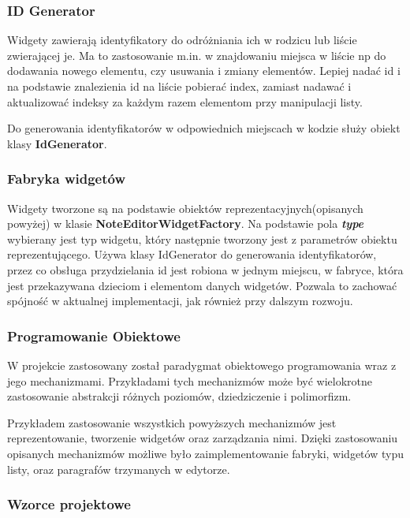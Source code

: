 \subsubsection{ID Generator}

Widgety zawierają identyfikatory do odróżniania ich w rodzicu lub liście zwierającej je. Ma to zastosowanie m.in. w znajdowaniu miejsca w liście np do dodawania nowego elementu, czy usuwania i zmiany elementów. Lepiej nadać id i na podstawie znalezienia id na liście pobierać index, zamiast nadawać i aktualizować indeksy za każdym razem elementom przy manipulacji listy.

Do generowania identyfikatorów w odpowiednich miejscach w kodzie służy obiekt klasy \textbf{IdGenerator}.

\subsubsection{Fabryka widgetów}

Widgety tworzone są na podstawie obiektów reprezentacyjnych(opisanych powyżej) w klasie \textbf{NoteEditorWidgetFactory}. Na podstawie pola \textbf{\textit{type}} wybierany jest typ widgetu, który następnie tworzony jest z parametrów obiektu reprezentującego. Używa klasy IdGenerator do generowania identyfikatorów, przez co obsługa przydzielania id jest robiona w jednym miejscu, w fabryce, która jest przekazywana dzieciom i elementom danych widgetów. Pozwala to zachować spójność w aktualnej implementacji, jak również przy dalszym rozwoju.

\subsubsection{Programowanie Obiektowe}

W projekcie zastosowany został paradygmat obiektowego programowania wraz z jego mechanizmami. Przykładami tych mechanizmów może być wielokrotne zastosowanie abstrakcji różnych poziomów, dziedziczenie i polimorfizm.

Przykładem zastosowanie wszystkich powyższych mechanizmów jest reprezentowanie, tworzenie widgetów oraz zarządzania nimi. 
Dzięki zastosowaniu opisanych mechanizmów możliwe było zaimplementowanie fabryki, widgetów typu listy, oraz paragrafów trzymanych w edytorze.

\subsubsection{Wzorce projektowe}

